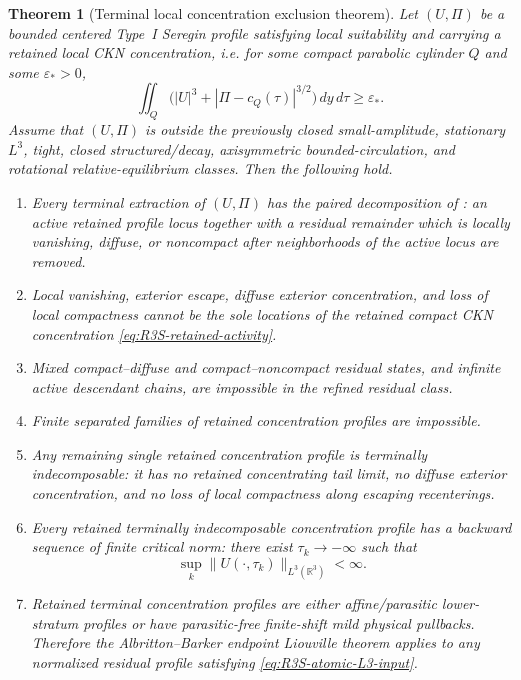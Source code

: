 \documentclass[11pt]{amsart}
\numberwithin{equation}{section}
\theoremstyle{plain}
\newtheorem{theorem}{Theorem}[section]
\theoremstyle{definition}
\theoremstyle{remark}
\begin{document}
\begin{theorem}[Terminal local concentration exclusion theorem]
\label{thm:R3S-terminal-package}
Let \((U,\Pi)\) be a bounded centered Type~I Seregin profile satisfying local
suitability and carrying a retained local CKN concentration, i.e. for some
compact parabolic cylinder \(Q\) and some \(\varepsilon_*>0\),
\begin{equation}\label{eq:R3S-retained-activity}
   \iint_Q\bigl(|U|^3+|\Pi-c_Q(\tau)|^{3/2}\bigr)\,dy\,d\tau
   \ge \varepsilon_* .
\end{equation}
Assume that \((U,\Pi)\) is outside the previously closed small-amplitude,
stationary \(L^3\), tight, closed structured/decay, axisymmetric
bounded-circulation, and rotational relative-equilibrium classes.  Then the
following hold.
\begin{enumerate}[label=(\roman*)]
   \item Every terminal extraction of \((U,\Pi)\) has the paired decomposition
   of : an active retained profile locus
   together with a residual remainder which is locally vanishing, diffuse, or
   noncompact after neighborhoods of the active locus are removed.
   \item Local vanishing, exterior escape, diffuse exterior concentration, and
   loss of local compactness cannot be the sole locations of the retained
   compact CKN concentration
   \eqref{eq:R3S-retained-activity}.
   \item Mixed compact--diffuse and compact--noncompact residual states, and
   infinite active descendant chains, are impossible in the refined residual
   class.
   \item Finite separated families of retained concentration profiles are
   impossible.
   \item Any remaining single retained concentration profile is terminally
   indecomposable: it has no retained concentrating tail limit, no diffuse
   exterior concentration, and no loss of local compactness along escaping
   recenterings.
   \item Every retained terminally indecomposable concentration profile has a
   backward sequence of finite critical norm: there exist
   \(\tau_k\to-\infty\) such that
   \begin{equation}\label{eq:R3S-atomic-L3-input}
      \sup_k \|U(\cdot,\tau_k)\|_{L^3(\mathbb R^3)}<\infty .
   \end{equation}
   \item Retained terminal concentration profiles are either affine/parasitic
   lower-stratum profiles or have parasitic-free finite-shift mild physical
   pullbacks.  Therefore the Albritton--Barker endpoint Liouville theorem
   applies to any normalized residual profile satisfying
   \eqref{eq:R3S-atomic-L3-input}.
\end{enumerate}
\end{theorem}
\end{document}
